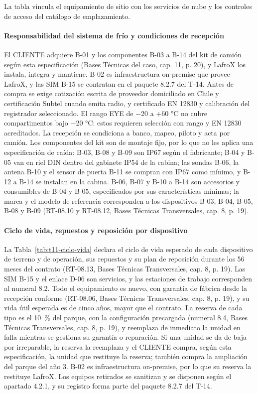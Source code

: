 La tabla vincula el equipamiento de sitio con los servicios de nube y los controles de acceso del catálogo de emplazamiento.

\paragraph{Responsabilidad del sistema de frío y condiciones de recepción}
El CLIENTE adquiere B-01 y los componentes B-03 a B-14 del kit de camión según esta especificación (Bases Técnicas del caso, cap. 11, p. 20), y LafroX los instala, integra y mantiene. B-02 es infraestructura on-premise que provee LafroX, y las SIM B-15 se contratan en el paquete 8.2.7 del T-14. Antes de compra se exige cotización escrita de proveedor domiciliado en Chile y certificación Subtel cuando emita radio, y certificado EN 12830 y calibración del registrador seleccionado. El rango EYE de −20 a +60 °C no cubre compartimentos bajo −20 °C: estos requieren selección con rango y EN 12830 acreditados. La recepción se condiciona a banco, mapeo, piloto y acta por camión. Los componentes del kit son de montaje fijo, por lo que no les aplica una especificación de caída: B-03, B-08 y B-09 son IP67 según el fabricante; B-04 y B-05 van en riel DIN dentro del gabinete IP54 de la cabina; las sondas B-06, la antena B-10 y el sensor de puerta B-11 se compran con IP67 como mínimo, y B-12 a B-14 se instalan en la cabina. B-06, B-07 y B-10 a B-14 son accesorios y consumibles de B-04 y B-05, especificados por sus características mínimas; la marca y el modelo de referencia corresponden a los dispositivos B-03, B-04, B-05, B-08 y B-09 (RT-08.10 y RT-08.12, Bases Técnicas Transversales, cap. 8, p. 19).

\paragraph{Ciclo de vida, repuestos y reposición por dispositivo}
La Tabla~\ref{tab:t11-ciclo-vida} declara el ciclo de vida esperado de cada dispositivo de terreno y de operación, sus repuestos y su plan de reposición durante los 56 meses del contrato (RT-08.13, Bases Técnicas Transversales, cap. 8, p. 19). Las SIM B-15 y el enlace D-06 son servicios, y las estaciones de trabajo corresponden al numeral 8.2. Todo el equipamiento es nuevo, con garantía de fábrica desde la recepción conforme (RT-08.06, Bases Técnicas Transversales, cap. 8, p. 19), y su vida útil esperada es de cinco años, mayor que el contrato. La reserva de cada tipo es el 10~\% del parque, con la configuración precargada (numeral 8.4, Bases Técnicas Transversales, cap. 8, p. 19), y reemplaza de inmediato la unidad en falla mientras se gestiona su garantía o reparación. Si una unidad se da de baja por irreparable, la reserva la reemplaza y el CLIENTE compra, según esta especificación, la unidad que restituye la reserva; también compra la ampliación del parque del año 3. B-02 es infraestructura on-premise, por lo que su reserva la restituye LafroX. Los equipos retirados se sanitizan y se disponen según el apartado 4.2.1, y su registro forma parte del paquete 8.2.7 del T-14.

